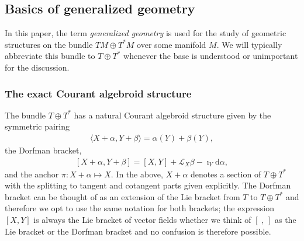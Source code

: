 \documentclass{article}
\newcommand{\TT}{{T\oplus T^*}}
\newcommand{\Lie}{\mathcal{L}}
\newcommand{\ap}{\alpha}
\newcommand{\bt}{\beta}
\newcommand{\rd}{\mathrm{d}}
\newcommand{\brac}{[\ ,\ ]}
\theoremstyle{definition}
\theoremstyle{remark}
\begin{document}
\subsection{Basics of generalized geometry}
In this paper, the term {\it generalized geometry} is used for the study of geometric structures on the bundle $TM \oplus T^*M$ over some manifold $M$. We will typically abbreviate this bundle to $\TT$ whenever the base is understood or unimportant for the discussion.

\subsubsection{The exact Courant algebroid structure}
The bundle $\TT$ has a natural Courant algebroid structure given by the symmetric pairing
\begin{align*}
\langle X+\ap,Y+\bt\rangle=\ap(Y)+\bt(Y),
\end{align*}
the Dorfman bracket,
\begin{align}\label{eq:dorfman}
[ X+\ap,Y+\bt]=[X,Y]+\Lie_X\bt-\imath_Y\rd \ap, 
\end{align}
and the anchor $\pi:X+\ap\mapsto X$. In the above, $X+\ap$ denotes a section of $\TT$ with the splitting to tangent and cotangent parts given explicitly. The Dorfman bracket can be thought of as an extension of the Lie bracket from $T$ to $\TT$ and therefore we opt to use the same notation for both brackets; the expression $[X,Y]$ is always the Lie bracket of vector fields whether we think of $\brac$ as the Lie bracket or the Dorfman bracket and no confusion is therefore possible.
\end{document}
